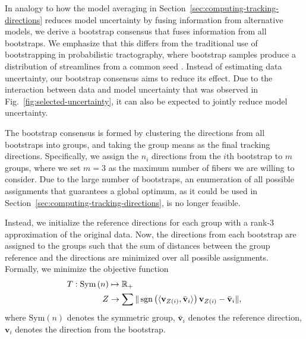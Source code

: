 In analogy to how the model averaging in Section~\ref{sec:computing-tracking-directions} reduces model uncertainty by fusing information from alternative models, we derive a bootstrap consensus that fuses information from all bootstraps. We emphasize that this differs from the traditional use of bootstrapping in probabilistic tractography, where bootstrap samples produce a distribution of streamlines from a common seed \cite{Jones:2008,Jeurissen:2011}. Instead of estimating data uncertainty, our bootstrap consensus aims to reduce its effect. Due to the interaction between data and model uncertainty that was observed in Fig.~\ref{fig:selected-uncertainty}, it can also be expected to jointly reduce model uncertainty.

The bootstrap consensus is formed by clustering the directions from all bootstraps into groups, and taking the group means as the final tracking directions. Specifically, we assign the $n_i$ directions from the $i$th bootstrap to $m$ groups, where we set $m=3$ as the maximum number of fibers we are willing to consider. Due to the large number of bootstraps, an enumeration of all possible assignments that guarantees a global optimum, as it could be used in Section~\ref{sec:computing-tracking-directions}, is no longer feasible.

Instead, we initialize the reference
directions for each group with a rank-$3$ approximation of the original data. Now, the
directions from each bootstrap are assigned to the groups such that the sum of
distances between the group
reference and the directions are minimized over all possible assignments. Formally, we minimize the objective function 
\begin{align}
	T : \text{Sym} \left( n \right) & \mapsto \mathbb{R}_+ \nonumber \\
	Z & \rightarrow \sum \| \operatorname*{sgn} \left( \langle \mathbf{v}_{Z\left( i
	\right)}, \bar{\mathbf{v}}_i \rangle \right) \mathbf{v}_{Z\left( i
	\right)} - \bar{\mathbf{v}}_i\| ,  
\end{align} 
where $\text{Sym}\left( n \right)$ denotes the symmetric group, 
$\bar{\mathbf{v}}_i$ denotes
the reference direction, $\mathbf{v}_i$ denotes the direction from the
bootstrap.

